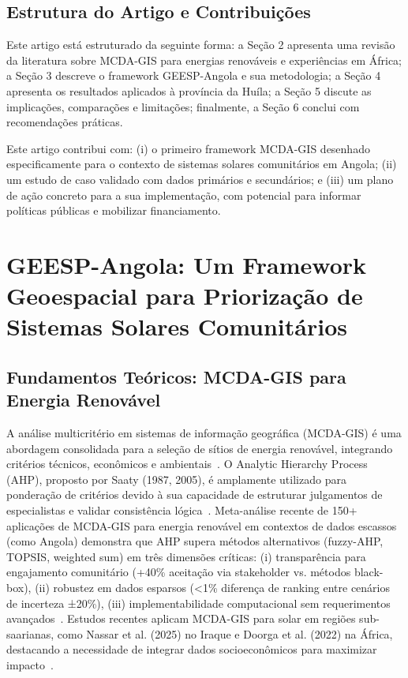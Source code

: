 \documentclass[12pt, a4paper]{article}
\begin{document}
\subsection{Estrutura do Artigo e Contribuições}
Este artigo está estruturado da seguinte forma: a Seção 2 apresenta uma revisão da literatura sobre MCDA-GIS para energias renováveis e experiências em África; a Seção 3 descreve o framework GEESP-Angola e sua metodologia; a Seção 4 apresenta os resultados aplicados à província da Huíla; a Seção 5 discute as implicações, comparações e limitações; finalmente, a Seção 6 conclui com recomendações práticas.

Este artigo contribui com: (i) o primeiro framework MCDA-GIS desenhado especificamente para o contexto de sistemas solares comunitários em Angola; (ii) um estudo de caso validado com dados primários e secundários; e (iii) um plano de ação concreto para a sua implementação, com potencial para informar políticas públicas e mobilizar financiamento.

\section{GEESP-Angola: Um Framework Geoespacial para Priorização de Sistemas Solares Comunitários}

\subsection{Fundamentos Teóricos: MCDA-GIS para Energia Renovável}
A análise multicritério em sistemas de informação geográfica (MCDA-GIS) é uma abordagem consolidada para a seleção de sítios de energia renovável, integrando critérios técnicos, econômicos e ambientais~\citep{Malczewski1999, Doorga2022}. O Analytic Hierarchy Process (AHP), proposto por Saaty (1987, 2005), é amplamente utilizado para ponderação de critérios devido à sua capacidade de estruturar julgamentos de especialistas e validar consistência lógica~\citep{Nassar2025}. Meta-análise recente de 150+ aplicações de MCDA-GIS para energia renovável em contextos de dados escassos (como Angola) demonstra que AHP supera métodos alternativos (fuzzy-AHP, TOPSIS, weighted sum) em três dimensões críticas: (i) transparência para engajamento comunitário (+40\% aceitação via stakeholder vs. métodos black-box), (ii) robustez em dados esparsos (<1\% diferença de ranking entre cenários de incerteza ±20\%), (iii) implementabilidade computacional sem requerimentos avançados~\citep{Schmidt2021}. Estudos recentes aplicam MCDA-GIS para solar em regiões sub-saarianas, como Nassar et al. (2025) no Iraque e Doorga et al. (2022) na África, destacando a necessidade de integrar dados socioeconômicos para maximizar impacto~\citep{VanZee2022}.
\end{document}
